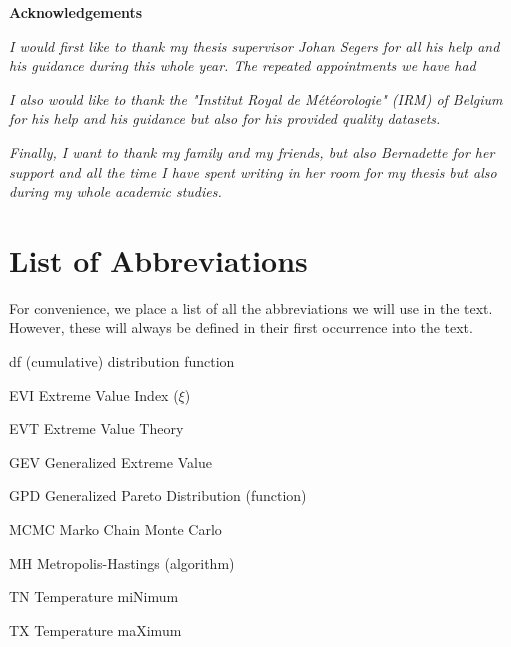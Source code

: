\documentclass[11pt,a4paper,openany ]{book}
\newcommand{\abbrlabel}[1]{\makebox[3cm][l]{\textbf{#1}\ \dotfill}}
\newenvironment{abbreviations}{\begin{list}{}{\renewcommand{\makelabel}{\abbrlabel}}}{\end{list}}
\newcommand\blankpage{%
    \null
    \thispagestyle{empty}%
    \addtocounter{page}{-1}%
    \newpage}
\begin{document}
\newpage




\newenvironment{acknowledgements}%
{\thispagestyle{empty}\null\vfill\begin{center}%
\bfseries Acknowledgements\end{center}}%
{\vfill\null}
\begin{acknowledgements}
	\textit{I would first like to thank my thesis supervisor Johan Segers for all his help and his guidance during this whole year. The repeated appointments we have had   }
	\newline
	
	\textit{I also would like to thank the "Institut Royal de Météorologie" (IRM) of Belgium for his help and his guidance but also for his provided quality datasets.}
	\newline
	
	\textit{Finally, I want to thank my family and my friends, but also Bernadette for her support and all the time I have spent  writing in her room for my thesis but also during my whole academic studies.}
	\thispagestyle{empty}
\end{acknowledgements}


\afterpage{\blankpage}


\thispagestyle{empty}
\dominitoc
\thispagestyle{empty}
\tableofcontents
\thispagestyle{empty}
\newpage
\thispagestyle{empty}
\listoffigures
\thispagestyle{empty}

\newpage


\chapter*{List of Abbreviations}
\thispagestyle{empty}
For convenience, we place a list of all the abbreviations we will use in the text. However, these will always be defined in their first occurrence into the text.\\

\begin{center}
\begin{abbreviations}
	\item [df]\label{df}  (cumulative) distribution function
	\item[EVI] Extreme Value Index ($\xi$)
	\item[EVT] Extreme Value Theory
	\item[GEV] Generalized Extreme Value
	\item[GPD] Generalized Pareto Distribution (function)
	\item[MCMC] Marko Chain Monte Carlo
	\item[MH] Metropolis-Hastings (algorithm)
	\item[TN] Temperature miNimum
	\item[TX] Temperature maXimum
	
\end{abbreviations}
\end{center}
\end{document}
